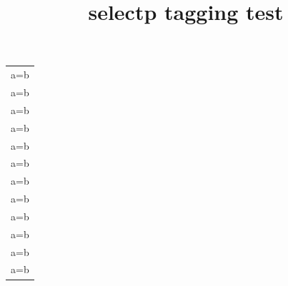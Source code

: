 \documentclass{article}
\title{selectp tagging test}
\begin{document}
\kant[1-3]
\Blinddocument
\begin{longtable}{c}
a=b \\
a=b \\
a=b \\
a=b \\
a=b \\
a=b \\
a=b \\
a=b \\
a=b \\
a=b \\
a=b \\
a=b \\
\end{longtable}
\end{document}
